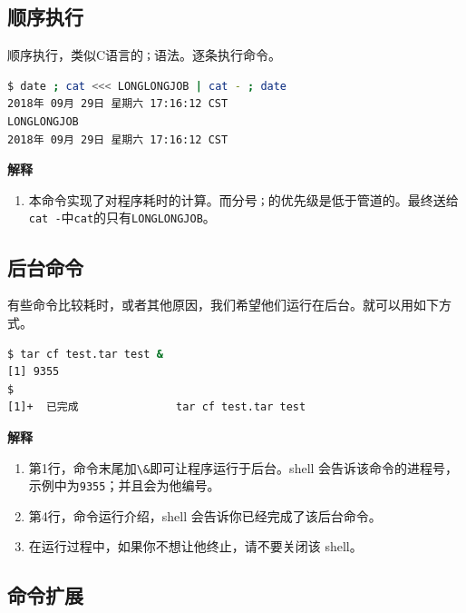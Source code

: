 \documentclass[doctor,openright,twoside]{sjtuthesis}
\providecommand{\tightlist}{%
    \setlength{\itemsep}{0pt}\setlength{\parskip}{0pt}}
\newcommand{\passthrough}[1]{#1}
\theoremstyle{plain}
\theoremstyle{definition}
\theoremstyle{remark}
\theoremstyle{ocrenumbox}
\theoremstyle{plain}
\begin{document}
\subsection{顺序执行}

顺序执行，类似C语言的\passthrough{\lstinline!；!}语法。逐条执行命令。

\begin{lstlisting}[language=bash]
$ date ; cat <<< LONGLONGJOB | cat - ; date
2018年 09月 29日 星期六 17:16:12 CST
LONGLONGJOB
2018年 09月 29日 星期六 17:16:12 CST
\end{lstlisting}

\textbf{解释}

\begin{enumerate}
\def\labelenumi{\arabic{enumi}.}
\tightlist
\item
  本命令实现了对程序耗时的计算。而分号\passthrough{\lstinline!；!}的优先级是低于管道的。最终送给\passthrough{\lstinline!cat -!}中\passthrough{\lstinline!cat!}的只有\passthrough{\lstinline!LONGLONGJOB!}。
\end{enumerate}

\subsection{后台命令}

有些命令比较耗时，或者其他原因，我们希望他们运行在后台。就可以用如下方式。

\begin{lstlisting}[language=bash]
$ tar cf test.tar test &
[1] 9355
$ 
[1]+  已完成               tar cf test.tar test
\end{lstlisting}

\textbf{解释}

\begin{enumerate}
\def\labelenumi{\arabic{enumi}.}
\tightlist
\item
  第1行，命令末尾加\passthrough{\lstinline!\&!}即可让程序运行于后台。shell
  会告诉该命令的进程号，示例中为\passthrough{\lstinline!9355!}；并且会为他编号。
\item
  第4行，命令运行介绍，shell 会告诉你已经完成了该后台命令。
\item
  在运行过程中，如果你不想让他终止，请不要关闭该 shell。
\end{enumerate}

\subsection{命令扩展}
\end{document}
